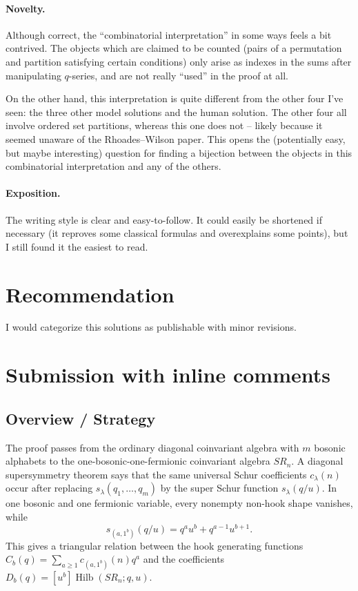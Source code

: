 \documentclass[12pt]{article}
\DeclareMathOperator{\Hilb}{Hilb}
\begin{document}
\paragraph{Novelty.}

Although correct, the ``combinatorial interpretation'' in some ways feels a bit contrived. The objects which are claimed to be counted (pairs of a permutation and partition satisfying certain conditions) only arise as indexes in the sums after manipulating $q$-series, and are not really ``used'' in the proof at all.

On the other hand, this interpretation is quite different from the other four I've seen: the three other model solutions and the human solution. The other four all involve ordered set partitions, whereas this one does not --   likely because it seemed unaware of the Rhoades--Wilson paper. This opens the (potentially easy, but maybe interesting) question for finding a bijection between the objects in this combinatorial interpretation and any of the others.

\paragraph{Exposition.}
The writing style is clear and easy-to-follow. It could easily be shortened if necessary (it reproves some classical formulas and overexplains some points), but I still found it the easiest to read.

\section{Recommendation}

I would categorize this solutions as publishable with minor revisions.


  \section{Submission with inline comments}

%
\date{}


\subsection*{Overview / Strategy}

The proof passes from the ordinary diagonal coinvariant algebra with \(m\) bosonic alphabets to the one-bosonic-one-fermionic coinvariant algebra \(SR_n\).  A diagonal supersymmetry theorem says that the same universal Schur coefficients \(c_\lambda(n)\) occur after replacing \(s_\lambda(q_1,\ldots,q_m)\) by the super Schur function \(s_\lambda(q/u)\).  In one bosonic and one fermionic variable, every nonempty non-hook shape vanishes, while
\[
s_{(a,1^b)}(q/u)=q^a u^b+q^{a-1}u^{b+1}.
\]
This gives a triangular relation between the hook generating functions \(C_b(q)=\sum_{a\ge 1}c_{(a,1^b)}(n)q^a\) and the coefficients \(D_b(q)=[u^b]\Hilb(SR_n;q,u)\).
\end{document}
